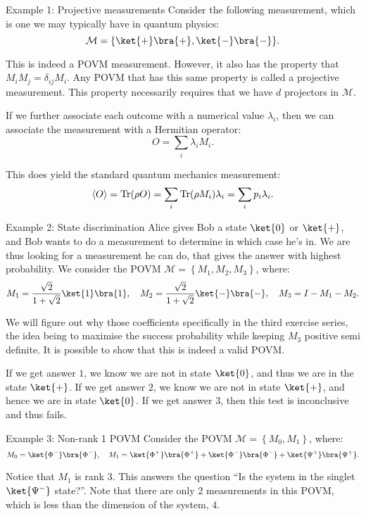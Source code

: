 \documentclass[a4paper]{article}
\begin{document}
\begin{parag}{Example 1: Projective measurements}
    Consider the following measurement, which is one we may typically have in quantum physics:
    \[\mathcal{M} = \left\{\ket{+}\bra{+}, \ket{-}\bra{-}\right\}.\]

    This is indeed a POVM measurement. However, it also has the property that $M_i M_j = \delta_{ij} M_i$. Any POVM that has this same property is called a projective measurement. This property necessarily requires that we have $d$ projectors in $\mathcal{M}$. 

    If we further associate each outcome with a numerical value $\lambda_i$, then we can associate the measurement with a Hermitian operator: 
    \[O = \sum_{i} \lambda_i M_i.\]
    
    This does yield the standard quantum mechanics measurement: 
    \[\left\langle O \right\rangle = \Tr\left(\rho O\right) = \sum_{i} \Tr\left(\rho M_i\right) \lambda_i = \sum_{i} p_i \lambda_i.\]
\end{parag}

\begin{parag}{Example 2: State discrimination}
    Alice gives Bob a state $\ket{0}$ or $\ket{+}$, and Bob wants to do a measurement to determine in which case he's in. We are thus looking for a measurement he can do, that gives the answer with highest probability. We consider the POVM $\mathcal{M} = \left\{M_1, M_2, M_3\right\}$, where:
    \[M_1 = \frac{\sqrt{2}}{1 + \sqrt{2}} \ket{1}\bra{1}, \mathspace M_2 = \frac{\sqrt{2}}{1 + \sqrt{2}} \ket{-}\bra{-}, \mathspace M_3 = I - M_1 - M_2.\]

    We will figure out why those coefficients specifically in the third exercise series, the idea being to maximise the success probability while keeping $M_3$ positive semi definite. It is possible to show that this is indeed a valid POVM.

    If we get answer $1$, we know we are not in state $\ket{0}$, and thus we are in the state $\ket{+}$. If we get answer $2$, we know we are not in state $\ket{+}$, and hence we are in state $\ket{0}$. If we get answer $3$, then this test is inconclusive and thus fails.
\end{parag}

\begin{parag}{Example 3: Non-rank 1 POVM}
    Consider the POVM $\mathcal{M} = \left\{M_0, M_1\right\}$, where:
    \[M_0 = \ket{\Phi^-}\bra{\Phi^-}, \mathspace M_1 = \ket{\Phi^+}\bra{\Phi^+} + \ket{\Phi^-}\bra{\Phi^-} + \ket{\Psi^+}\bra{\Psi^+}.\]

    Notice that $M_1$ is rank $3$. This answers the question ``Is the system in the singlet $\ket{\Psi^-}$ state?''. Note that there are only 2 measurements in this POVM, which is less than the dimension of the system, $4$.
\end{parag}
\end{document}
